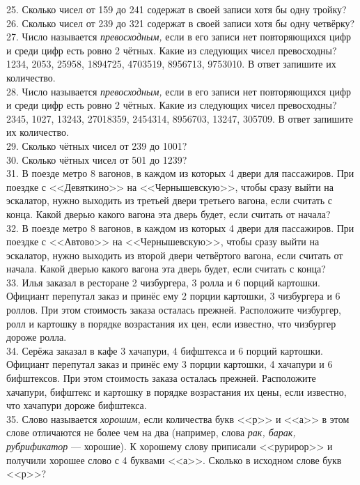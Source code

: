 \documentclass[12pt]{article}
\begin{document}
25. Сколько чисел от 159 до 241 содержат в своей записи хотя бы одну тройку?\\
26. Сколько чисел от 239 до 321 содержат в своей записи хотя бы одну четвёрку?\\
27. Число называется {\it превосходным,} если в его записи нет повторяющихся цифр и среди цифр есть ровно 2 чётных. Какие из следующих чисел превосходны? 1234, 2053, 25958, 1894725, 4703519, 8956713, 9753010. В ответ запишите их количество.\\
28. Число называется {\it превосходным,} если в его записи нет повторяющихся цифр и среди цифр есть ровно 2 чётных. Какие из следующих чисел превосходны? 2345, 1027, 13243, 27018359, 2454314, 8956703, 13247, 305709. В ответ запишите их количество.\\
29. Сколько чётных чисел от 239 до 1001?\\
30. Сколько чётных чисел от 501 до 1239?\\
31. В поезде метро 8 вагонов, в каждом из которых 4 двери для пассажиров. При поездке с <<Девяткино>> на <<Чернышевскую>>, чтобы сразу выйти на эскалатор, нужно выходить из третьей двери третьего вагона, если считать с конца. Какой дверью какого вагона эта дверь будет, если считать от начала?\\
32. В поезде метро 8 вагонов, в каждом из которых 4 двери для пассажиров. При поездке с <<Автово>> на <<Чернышевскую>>, чтобы сразу выйти на эскалатор, нужно выходить из второй двери четвёртого вагона, если считать от начала. Какой дверью какого вагона эта дверь будет, если считать с конца?\\
33. Илья заказал в ресторане 2 чизбургера, 3 ролла и 6 порций картошки. Официант перепутал заказ и принёс ему 2 порции картошки, 3 чизбургера и 6 роллов. При этом стоимость заказа осталась прежней. Расположите чизбургер, ролл и картошку в порядке возрастания их цен, если известно, что чизбургер дороже ролла.\\
34. Серёжа заказал в кафе 3 хачапури, 4 бифштекса и 6 порций картошки. Официант перепутал заказ и принёс ему 3 порции картошки, 4 хачапури и 6 бифштексов. При этом стоимость заказа осталась прежней. Расположите хачапури, бифштекс и картошку в порядке возрастания их цены, если известно, что хачапури дороже бифштекса.\\
35. Слово называется {\it хорошим,} если количества букв <<р>> и <<а>> в этом слове отличаются не более чем на два (например, слова {\it рак, барак, рубрификатор} --- хорошие). К хорошему слову приписали <<рурирор>> и получили хорошее слово с 4 буквами <<а>>. Сколько в исходном слове букв <<р>>?\\
\end{document}
